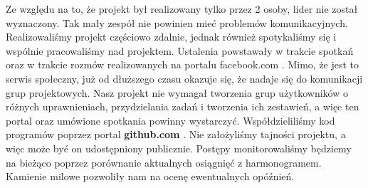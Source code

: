 Ze względu na to, że projekt był realizowany tylko przez 2 osoby, lider nie został wyznaczony. Tak mały zespół nie powinien mieć problemów komunikacyjnych. Realizowaliśmy projekt częściowo zdalnie, jednak również spotykaliśmy się i wspólnie pracowaliśmy nad projektem. Ustalenia powstawały w trakcie spotkań oraz w trakcie rozmów realizowanych na portalu facebook.com . Mimo, że jest to serwis społeczny, już od dłuższego czasu okazuje się, że nadaje się do komunikacji grup projektowych. Nasz projekt nie wymagał tworzenia grup użytkowników o różnych uprawnieniach, przydzielania zadań i tworzenia ich zestawień, a więc ten portal oraz umówione spotkania powinny wystarczyć. \newline
Współdzieliliśmy kod programów  poprzez portal \textbf{github.com} . Nie założyliśmy tajności projektu, a więc może być on udostępniony publicznie. \newline
Postępy monitorowaliśmy będziemy na bieżąco poprzez porównanie aktualnych osiągnięć z harmonogramem. Kamienie milowe pozwoliły nam na ocenę ewentualnych opóźnień.
\textsl{}
